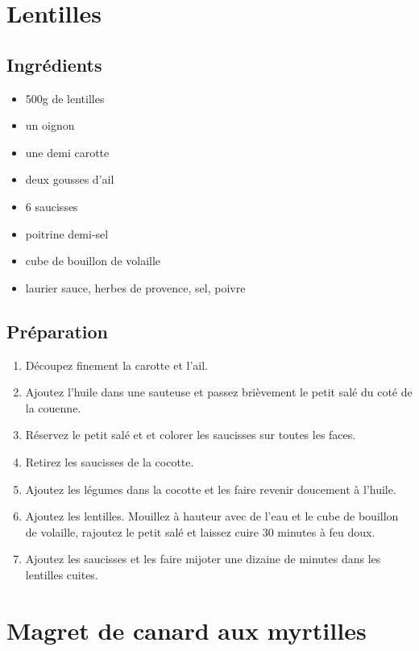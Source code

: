 \newpage
\section{Lentilles}
\subsection*{Ingrédients}
\begin{itemize}
\item 500g de lentilles
\item un oignon
\item une demi carotte
\item deux gousses d'ail
\item 6 saucisses
\item poitrine demi-sel
\item cube de bouillon de volaille
\item laurier sauce, herbes de provence, sel, poivre
\end{itemize}

\subsection*{Préparation}
\begin{enumerate}
\item Découpez finement la carotte et l'ail.
\item Ajoutez l'huile dans une sauteuse et passez brièvement le petit salé du coté de la couenne.
\item Réservez le petit salé et  et colorer les saucisses sur toutes les faces.
\item Retirez les saucisses de la cocotte.
\item Ajoutez les légumes dans la cocotte et les faire revenir doucement à l'huile.
\item Ajoutez les lentilles. Mouillez à hauteur avec de l'eau et le cube de bouillon de volaille, rajoutez le petit salé et laissez cuire 30 minutes à feu doux.
\item Ajoutez les saucisses et les faire mijoter une dizaine de minutes dans les lentilles cuites.
\end{enumerate}

\newpage
\section{Magret de canard aux myrtilles}
